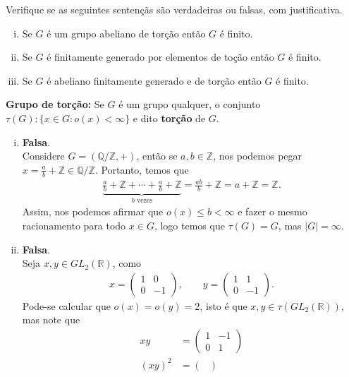 \begin{homeworkProblem}
  Verifique se as seguintes sentençãs são verdadeiras ou falsas, com justificativa.
  \begin{enumerate}[i)]
    \item Se $G$ é um grupo abeliano de torção então $G$ é finito.
    \item Se $G$ é finitamente generado por elementos de toção então $G$ é finito.
    \item Se $G$ é abeliano finitamente generado e de torção então $G$ é finito. 
  \end{enumerate}
\textbf{Grupo de torção:} Se $G$ é um grupo qualquer, o conjunto $\tau(G):\{x\in G: o(x)<\infty\}$ e dito \textbf{torção} de $G$. 
  \begin{solution}
\begin{enumerate}[i)]
  \item \textbf{Falsa}.\\
    Considere $G=(\mathbb{Q}/\mathbb{Z},+)$, então se $a,b\in \mathbb{Z}$, nos podemos pegar $x=\frac{a}{b}+\mathbb{Z}\in \mathbb{Q}/\mathbb{Z}$. Portanto, temos que 
    \begin{align*}
      \underbrace{\frac{a}{b}+\mathbb{Z}+\cdots+\frac{a}{b}+\mathbb{Z}}_{b\text{ vezes}}=\frac{ab}{b}+\mathbb{Z}=a+\mathbb{Z}=\mathbb{Z}. 
    \end{align*}
    Assim, nos podemos afirmar que $o(x)\leq b<\infty$ e fazer o mesmo racionamento para todo $x\in G$, logo temos que $\tau(G)=G$, mas $|G|=\infty$.
  \item \textbf{Falsa}.\\
    Seja $x,y\in GL_2(\mathbb{R})$, como  
    \begin{align*}
      x=\begin{pmatrix}
      1 & 0 \\
      0 & -1
      \end{pmatrix},\qquad y=\begin{pmatrix}
        1 & 1 \\
        0 & -1
      \end{pmatrix}.
    \end{align*}
    Pode-se calcular que $o(x)=o(y)=2$, isto é que $x,y\in\tau(GL_2(\mathbb{R}))$, mas note que
    \begin{align*}
      xy&=\begin{pmatrix}
      1 & -1 \\
      0 & 1
      \end{pmatrix}\\
      (xy)^2&=\begin{pmatrix}

\end{pmatrix}
\end{align*}
\end{enumerate}
\end{solution}
\end{homeworkProblem}

